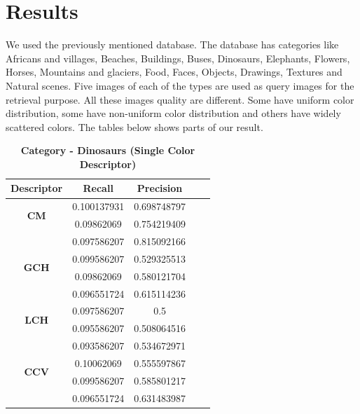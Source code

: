 \documentclass[pstricks,10pt,notitlepage]{report}
\begin{document}
\section{Results}
We used the previously mentioned database. The database has categories like  Africans and villages, Beaches, Buildings, Buses, Dinosaurs, Elephants, Flowers, Horses, Mountains and glaciers, Food, Faces, Objects, Drawings, Textures and Natural scenes. Five images of each of the types are used as query images for the retrieval purpose. All these images quality are different. Some have uniform color distribution, some have non-uniform color distribution and others have widely scattered colors. The tables below shows parts of our result.\\


\begin{table}
\centering
\caption{\textbf{Category - Dinosaurs (Single Color Descriptor)}}
\begin{tabular}{|c|c|c|c|c|}
\hline
Descriptor & Recall & Precision\\
\hline
\multirow{2}{*}{\textbf{CM}} & 0.100137931 & 0.698748797\\
& 0.09862069 & 0.754219409\\
& 0.097586207 & 0.815092166\\
\hline
\multirow{2}{*}{\textbf{GCH}} & 0.099586207 & 0.529325513\\ & 0.09862069 & 0.580121704\\ & 0.096551724 & 0.615114236\\
\hline
\multirow{2}{*}{\textbf{LCH}} & 0.097586207 & 0.5\\ & 0.095586207 & 0.508064516\\
& 0.093586207 & 0.534672971\\
\hline
\multirow{2}{*}{\textbf{CCV}} & 0.10062069 & 0.555597867\\ & 0.099586207 & 0.585801217\\ & 0.096551724 & 0.631483987\\
\hline
\end{tabular}
\label{tab:a}
\end{table}
\end{document}
